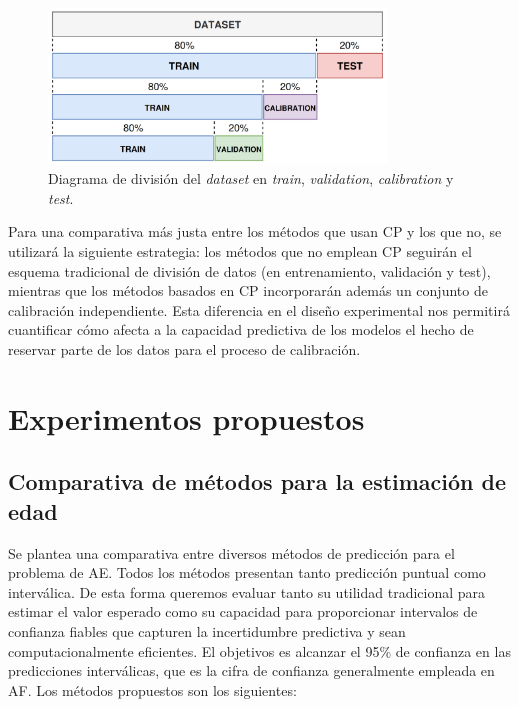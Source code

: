 \begin{figure}[h]
    \centering
    \includegraphics[width=0.8\textwidth]{capitulos/cap_04/imagenes/data_split_conformal.png}
    \caption[
        Diagrama de división del \textit{dataset} en \textit{train}, \textit{validation}, \textit{calibration} y \textit{test}.
    ]{
        Diagrama de división del \textit{dataset} en \textit{train}, \textit{validation}, \textit{calibration} y \textit{test}. 
    } 
    \label{fig:data_split_conformal}
\end{figure}

Para una comparativa más justa entre los métodos que usan CP y los que no, se utilizará la siguiente estrategia: los métodos que no emplean CP seguirán el esquema tradicional de división de datos (en entrenamiento, validación y test), mientras que los métodos basados en CP incorporarán además un conjunto de calibración independiente. Esta diferencia en el diseño experimental nos permitirá cuantificar cómo afecta a la capacidad predictiva de los modelos el hecho de reservar parte de los datos para el proceso de calibración.


\section{Experimentos propuestos}


\subsection{Comparativa de métodos para la estimación de edad}

Se plantea una comparativa entre diversos métodos de predicción para el problema de AE. Todos los métodos presentan tanto predicción puntual como interválica. De esta forma queremos evaluar tanto su utilidad tradicional para estimar el valor esperado como su capacidad para proporcionar intervalos de confianza fiables que capturen la incertidumbre predictiva y sean computacionalmente eficientes. El objetivos es alcanzar el 95\% de confianza en las predicciones interválicas, que es la cifra de confianza generalmente empleada en AF. Los métodos propuestos son los siguientes: 

